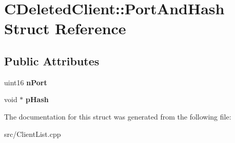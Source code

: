 \section{CDeletedClient::PortAndHash Struct Reference}
\label{structCDeletedClient_1_1PortAndHash}
\subsection*{Public Attributes}
\begin{DoxyCompactItemize}
\item 
uint16 {\bfseries nPort}\label{structCDeletedClient_1_1PortAndHash_a89079bcee3a2326170996914c7e47db2}

\item 
void $\ast$ {\bfseries pHash}\label{structCDeletedClient_1_1PortAndHash_a4adabbb4b44689e33ec1af2bdcb2838b}

\end{DoxyCompactItemize}


The documentation for this struct was generated from the following file:\begin{DoxyCompactItemize}
\item 
src/ClientList.cpp\end{DoxyCompactItemize}
